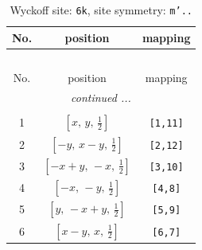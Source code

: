 \documentclass[fleqn,8pt]{jsarticle}
\begin{document}
\renewcommand{\arraystretch}{1.2}
\begin{longtable}{ccc}
\caption{Wyckoff site: {\tt 6k}, site symmetry: {\tt m'..}}
 \\
 \hline \hline
No. & position & mapping \\ \hline \endfirsthead

\multicolumn{2}{l}{\tablename\ \thetable{}} \\
 \hline \hline
No. & position & mapping \\ \hline \endhead

 \hline \hline
\multicolumn{2}{r}{\footnotesize\it continued ...} \\ \endfoot

 \hline \hline
\multicolumn{2}{r}{} \\ \endlastfoot

1 & $\left[ x,\, y,\, \frac{1}{2} \right]$ & {\tt [1,11]} \\ \hline
2 & $\left[ - y,\, x - y,\, \frac{1}{2} \right]$ & {\tt [2,12]} \\ \hline
3 & $\left[ - x + y,\, - x,\, \frac{1}{2} \right]$ & {\tt [3,10]} \\ \hline
4 & $\left[ - x,\, - y,\, \frac{1}{2} \right]$ & {\tt [4,8]} \\ \hline
5 & $\left[ y,\, - x + y,\, \frac{1}{2} \right]$ & {\tt [5,9]} \\ \hline
6 & $\left[ x - y,\, x,\, \frac{1}{2} \right]$ & {\tt [6,7]} \\
\end{longtable}
\renewcommand{\arraystretch}{1.2}
\end{document}
